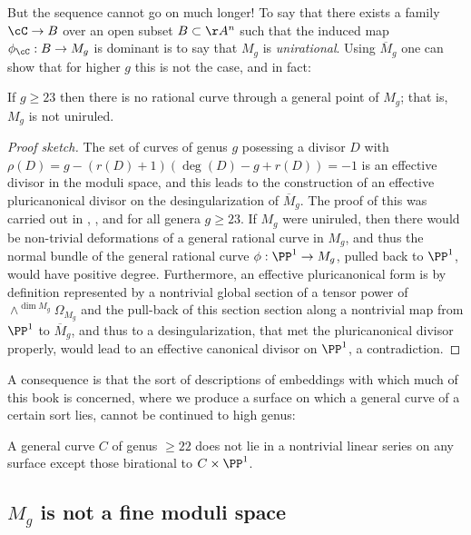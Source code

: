 But the sequence cannot go on much longer! To say that there exists a family $\cC \to B$ over an open subset $B \subset \AA^n$ such that the induced map $\phi_\cC : B \to M_g$ is dominant is to say that $M_g$ is \emph{unirational}. Using $\overline M_g$ one can show that for higher $g$ this is not the case, and in fact:

\begin{theorem}
If $g\geq 23$ then there is no rational curve through a general point of $M_g$; that is, $M_g$ is not uniruled.
\end{theorem}
\begin{proof}[Proof sketch]
The set of curves of genus $g$ posessing a divisor $D$ with $\rho(D) = g - (r(D)+1)(\deg(D) -g + r(D)) = -1$ is an effective divisor
in the moduli space, and this leads to the construction of an effective pluricanonical divisor on the desingularization of $\overline M_g$. The proof of this
was carried out in
\cite{Harris-Mumford-Moduli}, \cite{HarrisModuli}, and \cite{Eisenbud-HarrisModuli}
 for all genera $g \geq 23$.
If $M_g$ were uniruled, then there would be non-trivial deformations of a general rational curve in $M_g$, 
and thus the normal bundle of the general rational curve $\phi: \PP^1 \to M_g$, pulled back to $\PP^1$, would have positive degree. 
Furthermore, an effective pluricanonical form is by definition represented by a nontrivial global section of a tensor power
of $\wedge^{\dim M_g}\Omega_{M_g}$ and the pull-back of this section section 
along a nontrivial map from $\PP^1$ to $\overline M_g$, and thus to a desingularization, that met the pluricanonical divisor properly, would lead to an effective canonical divisor on $\PP^1$, a contradiction.
\end{proof}
 
 A consequence is that the sort of descriptions of embeddings with which much of this book is concerned, where we produce a surface on which a general curve of a certain sort lies, cannot be continued to high genus:

\begin{fact}
 A general curve $C$ of  genus $\geq 22$ does not lie in a nontrivial linear series on any surface
 except those birational to $C\times \PP^1$. 
\end{fact}


\subsection{$M_g$ is not a fine moduli space}\label{coarse moduli}

